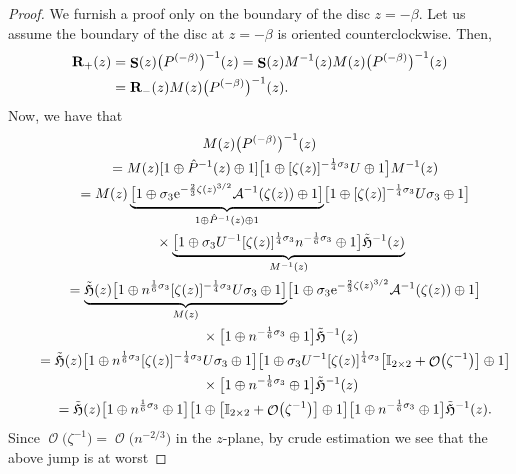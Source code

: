 \documentclass[pdftex]{sigma}
\DeclareMathOperator{\OO}{\mathcal{O}}
\DeclareMathOperator{\boldS}{{\bf S}}
\numberwithin{equation}{section}
\begin{document}
\begin{proof}
 We furnish a proof only on the boundary of the disc $z=-\beta$. Let us assume the boundary of the disc at $z=-\beta$ is oriented counterclockwise. Then,
 \begin{align*}
 {\bf R}_+(z) &{}= \boldS(z) \bigl(P^{(-\beta)}\bigr)^{-1}(z) = \boldS(z)M^{-1}(z)M(z) \bigl(P^{(-\beta)}\bigr)^{-1}(z) \\
 &{}= {\bf R}_-(z)M(z) \bigl(P^{(-\beta)}\bigr)^{-1}(z).
 \end{align*}
Now, we have that
 \begin{gather*}
 M(z) \bigl(P^{(-\beta)}\bigr)^{-1}(z)\\
 \qquad{}= M(z) [1\oplus \hat{P}^{-1}(z)\oplus 1] \bigl[1\oplus [\zeta(z)]^{-\frac{1}{4}\sigma_3}U \oplus 1\bigr] M^{-1}(z)\\
 \qquad{}= M(z)
 \underbrace{\bigl[1\oplus \sigma_3 {\rm e}^{-\frac{2}{3}\zeta(z)^{3/2}}\mathcal{A}^{-1}(\zeta(z))\oplus 1\bigr]}_{1\oplus \hat{P}^{-1}(z)\oplus 1}
 \bigl[1\oplus [\zeta(z)]^{-\frac{1}{4}\sigma_3}U\sigma_3 \oplus 1\bigr]\\
 \qquad\quad{}\times\underbrace{\bigl[1\oplus \sigma_3 U^{-1} [\zeta(z)]^{\frac{1}{4}\sigma_3}n^{-\frac{1}{6}\sigma_3}\oplus 1\bigr] \tilde{\mathfrak{H}}^{-1}(z)}_{M^{-1}(z)}\\
 \qquad{}=\underbrace{\tilde{\mathfrak{H}}(z) \bigl[1\oplus n^{\frac{1}{6}\sigma_3}[\zeta(z)]^{-\frac{1}{4}\sigma_3} U \sigma_3\oplus 1\bigr]}_{M(z)}
 \bigl[1\oplus \sigma_3 {\rm e}^{-\frac{2}{3}\zeta(z)^{3/2}}\mathcal{A}^{-1}(\zeta(z))\oplus 1\bigr]\\
 \qquad\quad{}\times \bigl[1\oplus n^{-\frac{1}{6}\sigma_3}\oplus 1\bigr] \tilde{\mathfrak{H}}^{-1}(z)\\
 \qquad{}=\tilde{\mathfrak{H}}(z) \bigl[1\oplus n^{\frac{1}{6}\sigma_3}[\zeta(z)]^{-\frac{1}{4}\sigma_3} U \sigma_3\oplus 1\bigr]
 \bigl[1\oplus \sigma_3 U^{-1}[\zeta(z)]^{\frac{1}{4}\sigma_3}\bigl[\mathbb{I}_{2\times 2} + \OO\bigl(\zeta^{-1}\bigr)\bigr]\oplus 1\bigr]\\
 \qquad\quad{}\times\bigl[1\oplus n^{-\frac{1}{6}\sigma_3}\oplus 1\bigr] \tilde{\mathfrak{H}}^{-1}(z)\\
 \qquad{}=\tilde{\mathfrak{H}}(z) \bigl[1\oplus n^{\frac{1}{6}\sigma_3}\oplus 1\bigr] \bigl[1\oplus\bigl[\mathbb{I}_{2\times 2} + \OO\bigl(\zeta^{-1}\bigr)\bigr]\oplus 1\bigr]\bigl[1\oplus n^{-\frac{1}{6}\sigma_3}\oplus 1\bigr] \tilde{\mathfrak{H}}^{-1}(z).
 \end{gather*}
 Since $\OO\bigl(\zeta^{-1}\bigr) = \OO\bigl(n^{-2/3}\bigr)$ in the $z$-plane, by crude estimation we see that the above jump is at worst

\end{proof}
\end{document}
